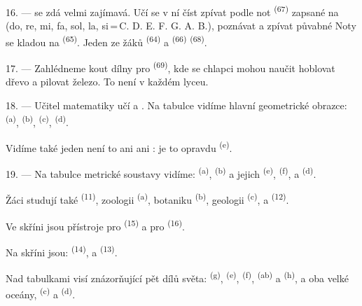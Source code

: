 16. ---  se zdá velmi zajímavá. Učí se v ní číst
 zpívat podle not  \textsuperscript{(67)}
zapsané na  (do, re, mi, fa, sol, la, si\,=\,C. D. E. F. G. A. B.), poznávat
 a zpívat půvabné
 Noty se kladou na  \textsuperscript{(65)}. Jeden ze
žáků  \textsuperscript{(64)} a 
\textsuperscript{(66)}  \textsuperscript{(68)}.

17. --- Zahlédneme kout dílny pro  \textsuperscript{(69)}, kde se chlapci
mohou naučit hoblovat dřevo a pilovat železo. To není v každém lyceu.

\VUsaut{5.0mm}
\VUsaut{3.6mm}

18. --- Učitel matematiky učí   a
. Na tabulce vidíme hlavní geometrické obrazce:
 \textsuperscript{(a)},  \textsuperscript{(b)},
 \textsuperscript{(c)},  \textsuperscript{(d)}.

Vidíme také jeden  není to  ani  ani
: je to opravdu  \textsuperscript{(e)}.

19. --- Na tabulce metrické soustavy vidíme:  \textsuperscript{(a)},
 \textsuperscript{(b)} a jejich  
\textsuperscript{(e)},  \textsuperscript{(f)},  a
 \textsuperscript{(d)}.

Žáci studují také  \textsuperscript{(11)}, zoologii \textsuperscript{(a)},
botaniku \textsuperscript{(b)}, geologii \textsuperscript{(c)}, a 
\textsuperscript{(12)}.

Ve skříni jsou přístroje pro  \textsuperscript{(15)} a pro
 \textsuperscript{(16)}.

Na skříni jsou:  \textsuperscript{(14)},  a
 \textsuperscript{(13)}.

Nad tabulkami visí  znázorňující pět dílů světa: 
\textsuperscript{(g)},  \textsuperscript{(e)}, 
\textsuperscript{(f)},  \textsuperscript{(ab)} a 
\textsuperscript{(h)}, a oba velké oceány,  \textsuperscript{(c)} a
 \textsuperscript{(d)}.
\VUsaut{6.0mm}
\VUfilet{22mm}
